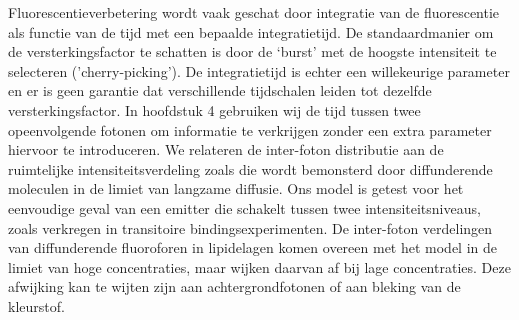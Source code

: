 Fluorescentieverbetering wordt vaak geschat door integratie van de fluorescentie als functie van de tijd met een bepaalde integratietijd. De standaardmanier om de versterkingsfactor te schatten is door de ‘burst’ met de hoogste intensiteit te selecteren ('cherry-picking'). De integratietijd is echter een willekeurige parameter en er is geen garantie dat verschillende tijdschalen leiden tot dezelfde versterkingsfactor. In hoofdstuk 4 gebruiken wij  de tijd  tussen twee opeenvolgende fotonen  om informatie te verkrijgen zonder een extra parameter hiervoor te introduceren. We relateren de inter-foton distributie aan de ruimtelijke intensiteitsverdeling zoals die wordt bemonsterd door diffunderende moleculen in de limiet van langzame diffusie. Ons model is getest voor het eenvoudige geval van een emitter die schakelt tussen twee intensiteitsniveaus, zoals verkregen in transitoire bindingsexperimenten. De inter-foton verdelingen van diffunderende fluoroforen in lipidelagen komen overeen met het model in de limiet van hoge concentraties, maar wijken daarvan af bij lage concentraties. Deze afwijking kan te wijten zijn aan achtergrondfotonen of aan bleking van de kleurstof.


